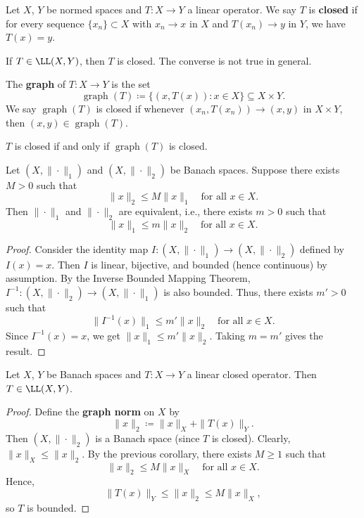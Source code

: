 \begin{definition}
Let $X$, $Y$ be normed spaces and $T: X \to Y$ a linear operator.  
We say $T$ is \textbf{closed} if for every sequence $\{x_n\} \subset X$ with  
$x_n \to x$ in $X$ and $T(x_n) \to y$ in $Y$, we have $T(x) = y$.
\end{definition}

\begin{remark}
If $T \in \LL(X,Y)$, then $T$ is closed.  
The converse is not true in general.
\end{remark}

\begin{definition}
The \textbf{graph} of $T: X \to Y$ is the set  
\[
\operatorname{graph}(T) \coloneqq \{(x, T(x)) : x \in X\} \subseteq X \times Y.
\]
We say $\operatorname{graph}(T)$ is closed if whenever $(x_n, T(x_n)) \to (x, y)$ in $X \times Y$,  
then $(x, y) \in \operatorname{graph}(T)$.
\end{definition}
$T$ is closed if and only if $\operatorname{graph}(T)$ is closed.

\clearpage
\begin{corollary}
Let $(X, \|\cdot\|_1)$ and $(X, \|\cdot\|_2)$ be Banach spaces.  
Suppose there exists $M > 0$ such that  
\[
\|x\|_2 \leq M \|x\|_1 \quad \text{for all } x \in X.
\]
Then $\|\cdot\|_1$ and $\|\cdot\|_2$ are equivalent, i.e., there exists $m > 0$ such that  
\[
\|x\|_1 \leq m \|x\|_2 \quad \text{for all } x \in X.
\]
\end{corollary}

\begin{proof}
Consider the identity map $I: (X, \|\cdot\|_1) \to (X, \|\cdot\|_2)$ defined by $I(x) = x$.  
Then $I$ is linear, bijective, and bounded (hence continuous) by assumption.  
By the Inverse Bounded Mapping Theorem, $I^{-1}: (X, \|\cdot\|_2) \to (X, \|\cdot\|_1)$ is also bounded.  
Thus, there exists $m' > 0$ such that  
\[
\|I^{-1}(x)\|_1 \leq m' \|x\|_2 \quad \text{for all } x \in X.
\]
Since $I^{-1}(x) = x$, we get $\|x\|_1 \leq m' \|x\|_2$.  
Taking $m = m'$ gives the result.
\end{proof}

\begin{theorem}
Let $X$, $Y$ be Banach spaces and $T: X \to Y$ a linear closed operator.  
Then $T \in \LL(X,Y)$.
\end{theorem}

\begin{proof}
Define the \textbf{graph norm} on $X$ by  
\[
\|x\|_2 \coloneqq \|x\|_X + \|T(x)\|_Y.
\]
Then $(X, \|\cdot\|_2)$ is a Banach space (since $T$ is closed).  
Clearly, $\|x\|_X \leq \|x\|_2$.  
By the previous corollary, there exists $M \geq 1$ such that  
\[
\|x\|_2 \leq M \|x\|_X \quad \text{for all } x \in X.
\]
Hence, 
\[
\|T(x)\|_Y \leq \|x\|_2 \leq M \|x\|_X,
\]
so $T$ is bounded.
\end{proof}
